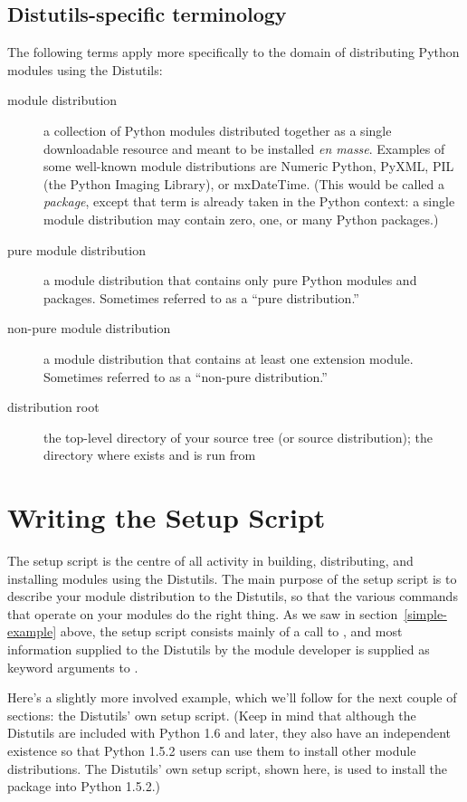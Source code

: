 \documentclass{howto}
\begin{document}
\subsection{Distutils-specific terminology}
\label{distutils-term}

The following terms apply more specifically to the domain of
distributing Python modules using the Distutils:
\begin{description}
\item[module distribution] a collection of Python modules distributed
  together as a single downloadable resource and meant to be installed
  \emph{en masse}.  Examples of some well-known module distributions are
  Numeric Python, PyXML, PIL (the Python Imaging Library), or
  mxDateTime.  (This would be called a \emph{package}, except that term
  is already taken in the Python context: a single module distribution
  may contain zero, one, or many Python packages.)
\item[pure module distribution] a module distribution that contains only
  pure Python modules and packages.  Sometimes referred to as a ``pure
  distribution.''
\item[non-pure module distribution] a module distribution that contains
  at least one extension module.  Sometimes referred to as a ``non-pure
  distribution.''
\item[distribution root] the top-level directory of your source tree (or 
  source distribution); the directory where  exists and
  is run from
\end{description}


\section{Writing the Setup Script}
\label{setup-script}

The setup script is the centre of all activity in building,
distributing, and installing modules using the Distutils.  The main
purpose of the setup script is to describe your module distribution to
the Distutils, so that the various commands that operate on your modules
do the right thing.  As we saw in section~\ref{simple-example} above,
the setup script consists mainly of a call to , and
most information supplied to the Distutils by the module developer is
supplied as keyword arguments to .

Here's a slightly more involved example, which we'll follow for the next
couple of sections: the Distutils' own setup script.  (Keep in mind that
although the Distutils are included with Python 1.6 and later, they also
have an independent existence so that Python 1.5.2 users can use them to
install other module distributions.  The Distutils' own setup script,
shown here, is used to install the package into Python 1.5.2.)
\end{document}
